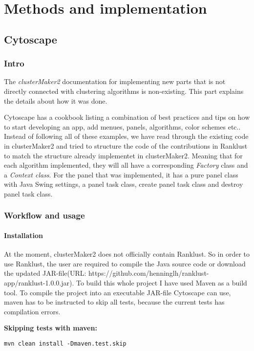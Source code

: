 \part{Methods and implementation}
\label{pa:methods}
\chapter{Cytoscape}
\section{Intro}
The \textit{clusterMaker2} documentation for implementing new parts that is not
directly connected with clustering algorithms is non-existing. This part
explains the details about how it was done.

Cytoscape has a cookbook\cite{cytoscape-cookbook} listing a combination of best
practices and tips on how to start developing an app, add menues, panels,
algorithms, color schemes etc.. Instead of following all of these examples, we
have read through the existing code in clusterMaker2\cite{cm2-github} and tried
to structure the code of the contributions in Ranklust to match the structure
already implementet in clusterMaker2. Meaning that for each algorithm
implemented, they will all have a corresponding \textit{Factory} class and a
\textit{Context class}. For the panel that was implemented, it has a pure panel
class with Java Swing\cite{java-swing} settings, a panel task class, create
panel task class and destroy panel task class.

\section{Workflow and usage}
\subsection{Installation}
At the moment, clusterMaker2 does not officially contain Ranklust. So in order
to use Ranklust, the user are required to compile the Java source code or
download the updated JAR-file\cite{jar}(URL:
https://github.com/henninglh/ranklust-app/ranklust-1.0.0.jar). To build this
whole project I have used Maven as a build tool\cite{maven}. To compile the
project into an executable JAR-file Cytoscape can use, \gls{maven} has to be
instructed to skip all tests, because the current tests has compilation errors.

\textbf{Skipping tests with maven:}
\begin{Verbatim}[fontsize=\scriptsize]
mvn clean install -Dmaven.test.skip
\end{Verbatim}

